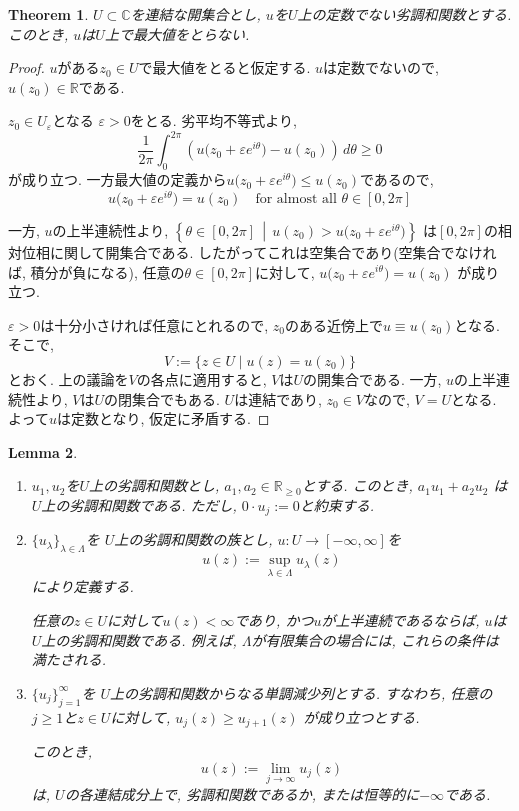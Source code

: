 \documentclass[dvipdfmx,a4paper,11pt]{report} %
\newtheorem{thm}{Theorem}[section]
\newtheorem{lem}[thm]{Lemma}
\theoremstyle{definition}
\theoremstyle{remark}
\numberwithin{equation}{section}
\newcommand{\R}{\mathbb{R}}
\newcommand{\C}{\mathbb{C}}
\begin{document}
\begin{tcolorbox}[mybox]
\begin{thm}
$U \subset \C$を連結な開集合とし,
$u$を$U$上の定数でない劣調和関数とする.
このとき, $u$は$U$上で最大値をとらない.
\end{thm}
\end{tcolorbox}

\begin{proof}
$u$がある$z_0 \in U$で最大値をとると仮定する.
$u$は定数でないので, $u(z_0) \in \R$である.

$z_0 \in U_\varepsilon$となる
$\varepsilon > 0$をとる.
劣平均不等式より,
\[
\frac{1}{2\pi}
\int_0^{2\pi}
\left(
u\bigl(z_0+\varepsilon e^{i\theta}\bigr)-u(z_0)
\right)\,d\theta
\geq 0
\]
が成り立つ.
一方最大値の定義から$u\bigl(z_0+\varepsilon e^{i\theta}\bigr) \le u(z_0)$であるので, 
$$
u\bigl(z_0+\varepsilon e^{i\theta}\bigr) 
=u(z_0)
\quad \text{for almost all $\theta \in [0, 2\pi]$}
$$

一方, $u$の上半連続性より,
\(
\left\{
\theta \in [0,2\pi]
\,\middle|\,
u(z_0)>u\bigl(z_0+\varepsilon e^{i\theta}\bigr)
\right\}
\)
は$[0,2\pi]$の相対位相に関して開集合である.
したがってこれは空集合であり(空集合でなければ, 積分が負になる), 
任意の$\theta \in [0,2\pi]$に対して,
\(
u\bigl(z_0+\varepsilon e^{i\theta}\bigr)=u(z_0)
\)
が成り立つ.

$\varepsilon > 0$は十分小さければ任意にとれるので,
$z_0$のある近傍上で$u \equiv u(z_0)$となる.
そこで,
\[
V:=\{z \in U \mid u(z)=u(z_0)\}
\]
とおく.
上の議論を$V$の各点に適用すると,
$V$は$U$の開集合である.
一方, $u$の上半連続性より,
$V$は$U$の閉集合でもある.
$U$は連結であり, $z_0 \in V$なので, $V=U$となる.
よって$u$は定数となり, 仮定に矛盾する.
\end{proof}

\begin{tcolorbox}[mybox]
\begin{lem}
\begin{enumerate}[label=(\roman*)]
\item
$u_1,u_2$を$U$上の劣調和関数とし,
$a_1,a_2 \in \R_{\geq 0}$とする.
このとき,
\(
a_1u_1+a_2u_2
\)
は$U$上の劣調和関数である.
ただし, $0 \cdot u_j:=0$と約束する.

\item
$\{u_\lambda\}_{\lambda \in \Lambda}$を
$U$上の劣調和関数の族とし,
$u \colon U \to [-\infty,\infty]$を
\[
u(z):=\sup_{\lambda \in \Lambda}u_\lambda(z)
\]
により定義する.

任意の$z \in U$に対して$u(z)<\infty$であり,
かつ$u$が上半連続であるならば,
$u$は$U$上の劣調和関数である.
例えば, $\Lambda$が有限集合の場合には,
これらの条件は満たされる.

\item
$\{u_j\}_{j=1}^{\infty}$を
$U$上の劣調和関数からなる単調減少列とする.
すなわち, 任意の$j \geq 1$と$z \in U$に対して,
\(
u_j(z) \geq u_{j+1}(z)
\)
が成り立つとする.

このとき,
\[
u(z):=\lim_{j \to \infty}u_j(z)
\]
は, $U$の各連結成分上で,
劣調和関数であるか, または恒等的に$-\infty$である.

\end{enumerate}
\end{lem}
\end{tcolorbox}
\end{document}
